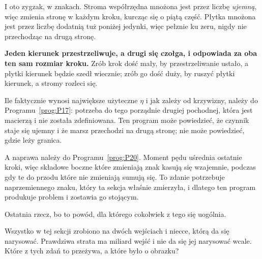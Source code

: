 \begin{fr}
I oto zygzak, w znakach. Stroma współrzędna mnożona jest przez liczbę
\emph{ujemną}, więc zmienia stronę w każdym kroku, kurcząc się o piątą część.
Płytka mnożona jest przez liczbę dodatnią tuż poniżej jedynki, więc pełznie ku
zeru, nigdy nie przechodząc na drugą stronę.

\textbf{Jeden kierunek przestrzeliwuje, a drugi się czołga, i odpowiada za oba
ten sam rozmiar kroku.} Zrób krok dość mały, by przestrzeliwanie ustało, a
płytki kierunek będzie szedł wiecznie; zrób go dość duży, by ruszyć płytki
kierunek, a stromy rozleci się.

\begin{rigourbox}
Ile faktycznie wynosi największe użyteczne $\eta$ i jak zależy od krzywizny,
należy do Programu~\ref{prog:P17}: potrzeba do tego porządnie drugiej
pochodnej, która jest macierzą i nie została zdefiniowana. Ten program może
powiedzieć, że czynnik staje się ujemny i że marsz przechodzi na drugą stronę;
nie może powiedzieć, gdzie leży granica.

A naprawa należy do Programu~\ref{prog:P20}. Moment pędu uśrednia ostatnie
kroki, więc składowe boczne \dash{} które zmieniają znak \dash{} kasują się
wzajemnie, podczas gdy te do przodu \dash{} które nie zmieniają \dash{}
sumują się. To zdanie potrzebuje naprzemiennego znaku, który ta sekcja
właśnie zmierzyła, i dlatego ten program produkuje problem i zostawia go
stojącym.
\end{rigourbox}
\end{fr}

\begin{fr}
Ostatnia rzecz, bo to powód, dla którego cokolwiek z tego się uogólnia.

Wszystko w tej sekcji zrobiono na dwóch wejściach i niecce, którą da się
narysować. Prawdziwa strata ma miliard wejść i nie da się jej narysować
wcale. Które z tych zdań to przeżywa, a które było o obrazku?
\dotline
\nextframe
\end{fr}

